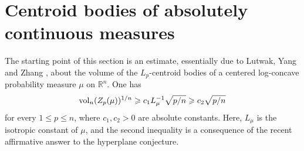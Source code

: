 \documentclass[11pt,leqno]{article}
\theoremstyle{definition}
\theoremstyle{remark}
\numberwithin{equation}{section}
\newcommand{\vol}{{\rm vol}}
\newcommand{\ls}{\leqslant}
\newcommand{\gr}{\geqslant}
\newcommand{\1}{\textbf{1}}
\begin{document}
\section{Centroid bodies of absolutely continuous measures}

The starting point of this section is an estimate, essentially due to Lutwak, Yang and Zhang \cite{Lutwak-Yang-Zhang-2000},
about the volume of the $L_p$-centroid
bodies of a centered log-concave probability measure $\mu$ on $\mathbb{R}^n$. One has
\begin{equation*}\vol_n(Z_p(\mu))^{1/n}\gr c_1L_{\mu}^{-1}\sqrt{p/n}\gr c_2\sqrt{p/n}\end{equation*}
for every $1\ls p\ls n$, where $c_1,c_2>0$ are absolute constants. Here, $L_{\mu}$ is the
isotropic constant of $\mu$, and the second inequality is a consequence of the recent
affirmative answer to the hyperplane conjecture.
\end{document}
